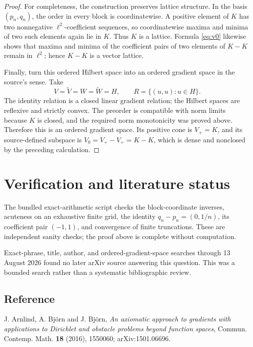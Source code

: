 \documentclass[11pt]{article}
\newcommand{\elltwo}{\ell^2}
\begin{document}
\begin{proof}
For completeness, the construction preserves lattice structure.  In the
basis \((p_n,q_n)\), the order in every block is coordinatewise.  A positive
element of \(K\) has two nonnegative \(\elltwo\)-coefficient sequences, so
coordinatewise maxima and minima of two such elements again lie in \(K\).
Thus \(K\) is a lattice.  Formula \eqref{eq:v0} likewise shows that maxima
and minima of the coefficient pairs of two elements of \(K-K\) remain in
\(\elltwo\); hence \(K-K\) is a vector lattice.

Finally, turn this ordered Hilbert space into an ordered gradient space in
the source's sense.  Take
\[
 V=\widetilde V=W=\widetilde W=H,
 \qquad R=\{(u,u):u\in H\}.
\]
The identity relation is a closed linear gradient relation; the Hilbert
spaces are reflexive and strictly convex.  The preorder is compatible with
norm limits because \(K\) is closed, and the required norm monotonicity was
proved above.  Therefore this is an ordered gradient space.  Its positive
cone is \(V_+=K\), and its source-defined subspace is
\(V_0=V_+-V_+=K-K\), which is dense and nonclosed by the preceding
calculation.
\end{proof}

\small
\section*{Verification and literature status}
The bundled exact-arithmetic script checks the block-coordinate inverses,
acuteness on an exhaustive finite grid, the identity
\(q_n-p_n=(0,1/n)\), its coefficient pair \((-1,1)\), and convergence of
finite truncations.  These are independent sanity checks; the proof above
is complete without computation.

Exact-phrase, title, author, and ordered-gradient-space searches through
13 August 2026 found no later arXiv source answering this question.  This
was a bounded search rather than a systematic bibliographic review.

\subsection*{Reference}
\noindent [1] J. Arnlind, A. Bj\"orn and J. Bj\"orn,
\emph{An axiomatic approach to gradients with applications to Dirichlet and
obstacle problems beyond function spaces},
Commun. Contemp. Math. \textbf{18} (2016), 1550060;
arXiv:1501.06696.
\end{document}

